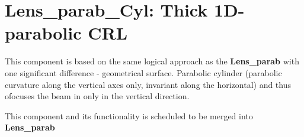 \section{Lens\_parab\_Cyl: Thick 1D-parabolic CRL}
This component is based on the same logical approach as the
\textbf{Lens\_parab} with one significant difference - geometrical surface.
Parabolic cylinder (parabolic curvature along the vertical axes only, invariant
along the horizontal) and thus ofocuses the beam in only in the vertical direction.

This component and its functionality is scheduled to be merged into \textbf{Lens\_parab}

